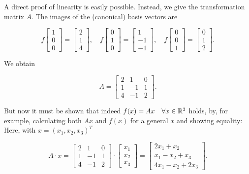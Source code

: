 A direct proof of linearity is easily possible. Instead, we give the transformation matrix \(A\). The images of the (canonical) basis vectors are

\[
    f\begin{bmatrix}
    1 \\
    0 \\
    0
    \end{bmatrix} =
    \begin{bmatrix}
    2 \\
    1 \\
    4
    \end{bmatrix} , \quad
    f\begin{bmatrix}
    0 \\
    1 \\
    0
    \end{bmatrix} =
    \begin{bmatrix}
    1 \\
    -1 \\
    -1
    \end{bmatrix} , \quad
    f\begin{bmatrix}
    0 \\
    0 \\
    1
    \end{bmatrix} =
    \begin{bmatrix}
    0 \\
    1 \\
    2
    \end{bmatrix} .
\]

We obtain

\[
    A =
    \begin{bmatrix}
    2 & 1 & 0 \\
    1 & -1 & 1 \\
    4 & -1 & 2
    \end{bmatrix} .
\]

But now it must be shown that indeed \(f(x) = Ax \quad \forall x \in \mathbb{R}^3\) holds, by, 
for example, calculating both \(Ax\) and \(f(x)\) for a 
general \(x\) and showing equality: Here, with \(x = {(x_1, x_2, x_3)}^T\)

\[
    A \cdot x =
    \begin{bmatrix}
    2 & 1 & 0 \\
    1 & -1 & 1 \\
    4 & -1 & 2
    \end{bmatrix}
    \cdot
    \begin{bmatrix}
    x_1 \\
    x_2 \\
    x_3
    \end{bmatrix} =
    \begin{bmatrix}
    2x_1 + x_2 \\
    x_1 - x_2 + x_3 \\
    4x_1 - x_2 + 2x_3
    \end{bmatrix} .
\]

